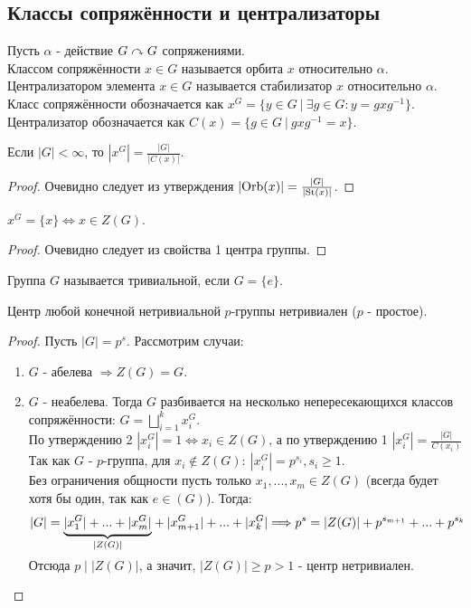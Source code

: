 \subsection{Классы сопряжённости и централизаторы}
\begin{definition}
    Пусть $\alpha$ - действие $G \curvearrowright G$ сопряжениями.\\
    Классом сопряжённости $x \in G$ называется орбита $x$ относительно $\alpha$.\\
    Централизатором элемента $x \in G$ называется стабилизатор $x$ относительно $\alpha$.\\
    Класс сопряжённости обозначается как $x^G = \{y \in G \ | \ \exists g \in G: y = gxg^{-1}\}$.
    Централизатор обозначается как $C(x) = \{g \in G \ |\ gxg^{-1} = x\}$.
\end{definition}
\begin{subtheoremnum}
    Если $|G| < \infty$, то $|x^{G}| = \frac{|G|}{|C(x)|}$.
\end{subtheoremnum}
\begin{proof}
    Очевидно следует из утверждения $|\textup{Orb}(x)| = \frac{|G|}{|\textup{St}(x)|}$.
\end{proof}
\begin{subtheoremnum}
    $x^G = \{x\} \Longleftrightarrow x \in Z(G)$.
\end{subtheoremnum}
\begin{proof}
    Очевидно следует из свойства 1 центра группы.
\end{proof}
\begin{definition}
    Группа $G$ называется тривиальной, если $G = \{e\}$.
\end{definition}
\begin{theorem}
    Центр любой конечной нетривиальной $p$-группы нетривиален ($p$ - простое).
\end{theorem}
\begin{proof}
    Пусть $|G| = p^s$. Рассмотрим случаи:
    \begin{enumerate}
        \item $G$ - абелева $\Longrightarrow Z(G) = G$.
        \item $G$ - неабелева. Тогда $G$ разбивается на несколько непересекающихся классов сопряжённости: $G = \bigsqcup \limits_{i=1}^k x_i^G$.\\
        По утверждению 2 $|x_i^G| = 1 \Longleftrightarrow x_i \in Z(G)$, а по утверждению 1 $|x_i^G| = \frac{|G|}{C(x_i)}$\\
        Так как $G$ - $p$-группа, для $x_i \notin Z(G): \  |x_i^G| = p^{s_i}, s_i \geqslant 1$.\\
        Без ограничения общности пусть только $x_1,...,x_m \in Z(G)$ (всегда будет хотя бы один, так как $e \in (G)$). Тогда: 
        \[|G| = \undermat{|Z(G)|}{|x_1^G| + ... + |x_m^G|} + |x_{m+1}^G| + ... + |x_k^G| \Longrightarrow p^s = |Z(G)| + p^{s_{m+1}} + ... + p^{s_k}\]
        \\
        Отсюда $p \mid |Z(G)|$, а значит, $|Z(G)| \geqslant p > 1$ - центр нетривиален.
    \end{enumerate}
\end{proof}
